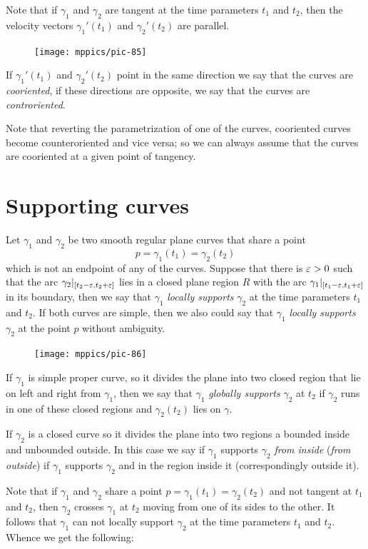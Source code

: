 Note that if $\gamma_1$ and $\gamma_2$ are tangent at the time parameters $t_1$ and $t_2$, 
then the velocity vectors $\gamma_1'(t_1)$ and $\gamma_2'(t_2)$ are parallel.
\begin{figure}[h!]
\vskip-0mm
\centering
\texttt{[image: mppics/pic-85]}
\vskip0mm
\end{figure}
If $\gamma_1'(t_1)$ and $\gamma_2'(t_2)$ point in the same direction we say that the curves are \emph{cooriented},
if these directions are opposite, we say that the curves are \emph{controriented}.


Note that reverting the parametrization of one of the curves, cooriented curves become counteroriented and vice versa; so we can always assume that the curves are cooriented at a given point of tangency.

\section*{Supporting curves}

Let $\gamma_1$ and $\gamma_2$ be two smooth regular plane curves that share a point \[p=\gamma_1(t_1)=\gamma_2(t_2)\] which is not an endpoint of any of the curves.
Suppose that there is $\varepsilon>0$ such that the arc $\gamma_2|_{[t_2-\varepsilon, t_2+\varepsilon]}$ lies in a closed plane region $R$ with the arc $\gamma_1|_{[t_1-\varepsilon, t_1+\varepsilon]}$ in its boundary,
then we say that $\gamma_1$ \emph{locally supports} $\gamma_2$ at the time parameters $t_1$ and $t_2$.
If both curves are simple, then we also could say that $\gamma_1$ \emph{locally supports} $\gamma_2$ at the point $p$ without ambiguity.

\begin{figure}
\vskip-3mm
\centering
\texttt{[image: mppics/pic-86]}
\vskip0mm
\end{figure}

If $\gamma_1$ is simple proper curve, so it divides the plane into two closed region that lie on left and right from $\gamma_1$, then we say that $\gamma_1$ \emph{globally supports} $\gamma_2$ at $t_2$ 
if $\gamma_2$ runs in one of these closed regions and 
$\gamma_2(t_2)$ lies on $\gamma$.

If $\gamma_2$ is a closed curve so it divides the plane into two regions a bounded inside and unbounded outside.
In this case we say if $\gamma_1$ supports $\gamma_2$ \emph{from inside} (\emph{from outside}) if $\gamma_1$ supports $\gamma_2$ and in the region inside it (correspondingly outside it). 

Note that if $\gamma_1$ and $\gamma_2$ share a point $p=\gamma_1(t_1)=\gamma_2(t_2)$ and not tangent at $t_1$ and $t_2$, then  $\gamma_2$ crosses $\gamma_1$ at $t_2$ moving from one of its sides to the other.
It follows that $\gamma_1$ can not locally support $\gamma_2$ at the time parameters $t_1$ and $t_2$.
Whence we get the following:

